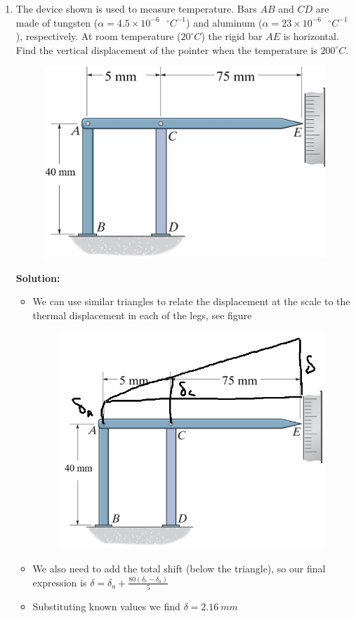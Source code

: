 \documentclass[12pt, oneside]{article}
\begin{document}
\begin{enumerate}
	\item %
		The device shown is used to measure temperature.
		Bars $AB$ and $CD$ are made of tungsten ($\alpha = 4.5 \times 10^{-6} \text{ } ^\circ C^{-1}$) and aluminum ($\alpha = 23 \times 10^{-6} \text{ } ^\circ C^{-1}$), respectively.
		At room temperature ($20^\circ C$) the rigid bar $AE$ is horizontal.
		Find the vertical displacement of the pointer when the temperature is $200 ^\circ C$.
		\begin{figure}[H]
			\centering
			\includegraphics[width=0.8\linewidth]{4-76}
		\end{figure}
		\textbf{Solution:}
		\begin{itemize}
			\item We can use similar triangles to relate the displacement at the scale to the thermal displacement in each of the legs, see figure
				\begin{figure}[H]
					\centering
					\includegraphics[width=0.6\linewidth]{7}
				\end{figure}
			\item We also need to add the total shift (below the triangle), so our final expression is $\delta = \delta_a + \frac{80(\delta_c-\delta_a)}{5}$
			\item Substituting known values we find $\delta = \SI{2.16}{mm}$
		\end{itemize}

\end{enumerate}
\end{document}
